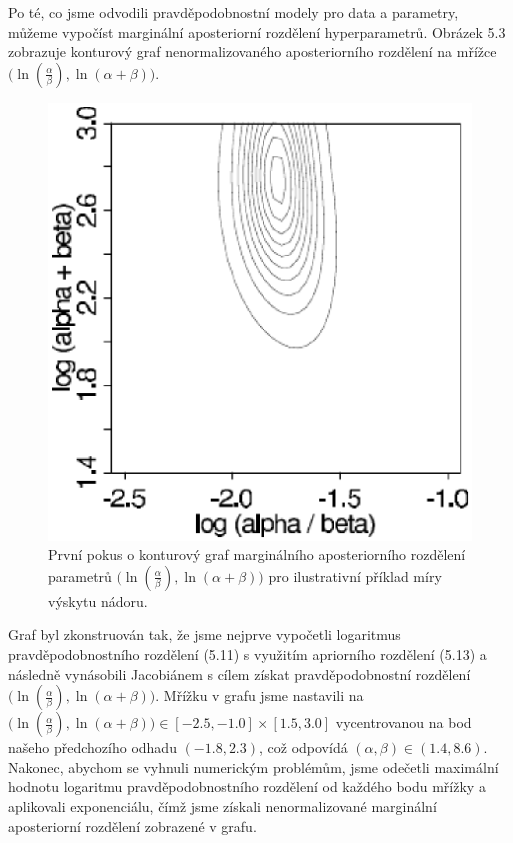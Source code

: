 Po té, co jsme odvodili pravděpodobnostní modely pro data a parametry, můžeme vypočíst marginální aposteriorní rozdělení hyperparametrů. Obrázek 5.3 zobrazuje konturový graf nenormalizovaného aposteriorního rozdělení na mřížce $\big(\ln(\frac{\alpha}{\beta}), \ln(\alpha + \beta) \big)$.
\begin{figure}[htp]
\centering
\includegraphics[scale = 0.45]{pictures/fig_5_2.eps}
\caption{První pokus o konturový graf marginálního aposteriorního rozdělení parametrů $\big(\ln(\frac{\alpha}{\beta}), \ln(\alpha + \beta) \big)$ pro ilustrativní příklad míry výskytu nádoru.}
\label{fig_5_2}
\end{figure}
Graf byl zkonstruován tak, že jsme nejprve vypočetli logaritmus pravděpodobnostního rozdělení (5.11) s využitím apriorního rozdělení (5.13) a následně vynásobili Jacobiánem s cílem získat pravděpodobnostní rozdělení $\big(\ln(\frac{\alpha}{\beta}), \ln(\alpha + \beta) \big)$. Mřížku v grafu jsme nastavili na $\big(\ln(\frac{\alpha}{\beta}), \ln(\alpha + \beta) \big) \in [-2.5, -1.0] \times [1.5, 3.0]$ vycentrovanou na bod našeho předchozího odhadu $(-1.8, 2.3)$, což odpovídá $(\alpha, \beta) \in (1.4, 8.6)$. Nakonec, abychom se vyhnuli numerickým problémům, jsme odečetli maximální hodnotu logaritmu pravděpodobnostního rozdělení od každého bodu mřížky a aplikovali exponenciálu, čímž jsme získali nenormalizované marginální aposteriorní rozdělení zobrazené v grafu.

